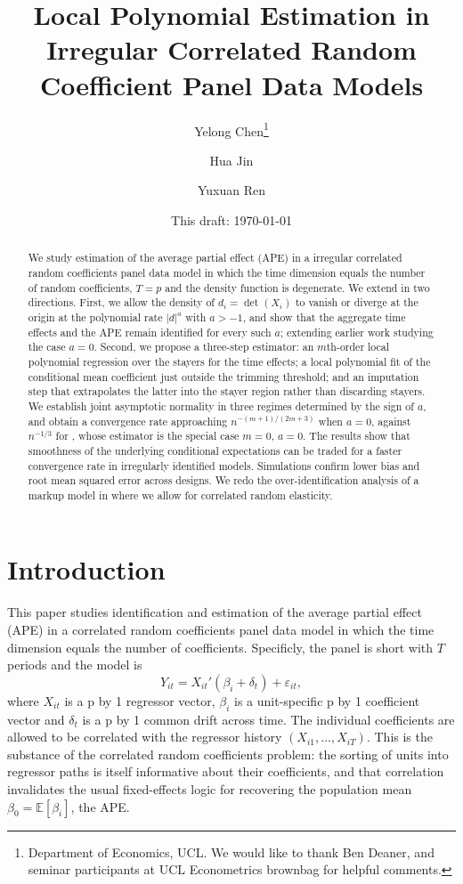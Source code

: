 \documentclass{article}
\title{Local Polynomial Estimation in Irregular Correlated Random Coefficient Panel Data Models}
\author{
Yelong Chen\thanks{Department of Economics, UCL. We would like to thank Ben Deaner, and seminar participants at UCL Econometrics brownbag for helpful comments.}
\and Hua Jin\footnotemark[1]
\and Yuxuan Ren\footnotemark[1]
}
\date{This draft: \today}
\begin{document}
\maketitle
\normalsize
\doublespacing

\begin{abstract}
We study estimation of the average partial effect (APE) in a irregular correlated random coefficients panel data model in which the time dimension equals the number of random coefficients, $T=p$ and the density function is degenerate. We extend \cite{grahampowell} in two directions. First, we allow the density of $d_i=\det(X_i)$ to vanish or diverge at the origin at the polynomial rate $|d|^{a}$ with $a>-1$, and show that the aggregate time effects and the APE remain identified for every such
$a$; extending earlier work studying the case $a=0$. 
Second, we propose a three-step estimator: an $m$th-order local polynomial regression over the stayers for the time effects; 
a local polynomial fit of the conditional mean coefficient just outside the trimming threshold; and an imputation step that extrapolates the latter into the stayer region rather than discarding stayers. We establish joint asymptotic normality in three regimes determined by the sign of $a$, and obtain a convergence rate approaching $n^{-(m+1)/(2m+3)}$ when $a=0$, against $n^{-1/3}$ for \cite{grahampowell}, whose estimator is the special case $m=0$, $a=0$. The results show that smoothness of the underlying conditional expectations can be traded for a faster convergence rate in irregularly identified models. Simulations confirm lower bias and root mean squared error across designs. We redo the over-identification analysis of a markup model in \cite{Raval2023} where we allow for correlated random elasticity.
\end{abstract}

\newpage
\section{Introduction}
This paper studies identification and estimation of the average partial effect (APE) in a correlated random coefficients panel data model in which the time dimension equals the number of coefficients. Specificly, the panel is short with $T$ periods and the model is
\begin{equation}
Y_{it}=X_{it}'(\beta_i+\delta_t)+\varepsilon_{it},
\label{eq:intro_model}
\end{equation}
where $X_{it}$ is a p by 1 regressor vector, $\beta_i$ is a unit-specific p by 1 coefficient vector and $\delta_t$ is a p by 1 common drift across time. The individual coefficients are allowed to be correlated with the regressor history $(X_{i1},\ldots,X_{iT})$. This is the substance of the correlated random coefficients problem: the sorting of units into regressor paths is itself informative about their coefficients, and that correlation invalidates the usual fixed-effects logic for recovering the population mean $\beta_0=\mathbb{E}[\beta_i]$, the APE.
\end{document}
